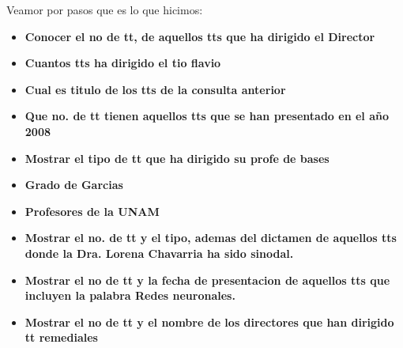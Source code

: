 \documentclass[12pt, fleqn]{article}                             %
\begin{document}
    Veamor por pasos que es lo que hicimos:

    \begin{itemize}

        \item
            \textbf{Conocer el no de tt, de aquellos tts que ha dirigido el Director}
            

        \item
            \textbf{Cuantos tts ha dirigido el tio flavio }
            

        \item
            \textbf{Cual es titulo de los tts de la consulta anterior}
            

        \item
            \textbf{Que no. de tt tienen aquellos tts que se han presentado en el año 2008}
            

        \item
            \textbf{Mostrar el tipo de tt que ha dirigido su profe de bases}
            

        \item
            \textbf{Grado de Garcias}
            

        \item
            \textbf{Profesores de la UNAM}
            

        \item
            \textbf{Mostrar el no. de tt y el tipo, ademas del dictamen de aquellos tts donde la Dra. Lorena Chavarria ha sido sinodal.}
            

        \item
            \textbf{Mostrar el no de tt y la fecha de presentacion de aquellos tts que incluyen la palabra Redes neuronales.}
            

        \item
            \textbf{Mostrar el no de tt y el nombre de los directores que han dirigido tt remediales}
            


\end{itemize}
\end{document}

